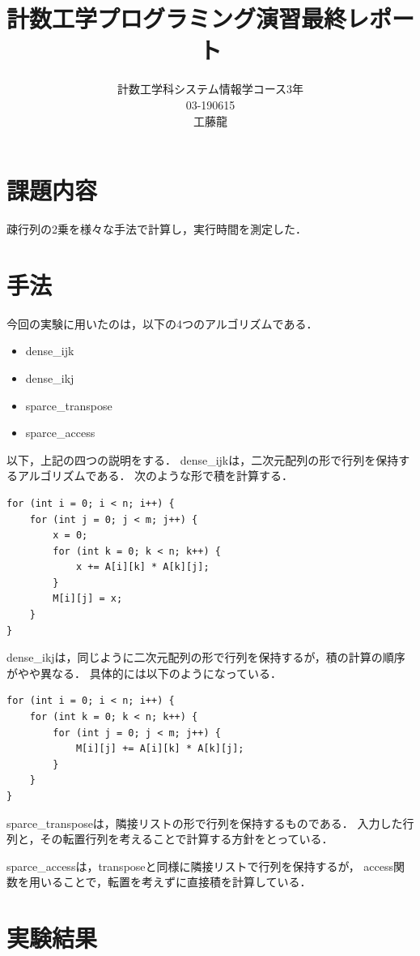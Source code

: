 \documentclass[11pt,a4paper]{jsarticle}
\begin{document}
\title{計数工学プログラミング演習最終レポート}
\author{計数工学科システム情報学コース3年\\03-190615\\工藤龍}
\maketitle

\section{課題内容}

疎行列の2乗を様々な手法で計算し，実行時間を測定した．

\section{手法}

今回の実験に用いたのは，以下の4つのアルゴリズムである．
\begin{itemize}
\item dense_ijk
\item dense_ikj
\item sparce_transpose
\item sparce_access
\end{itemize}
以下，上記の四つの説明をする．
dense_ijkは，二次元配列の形で行列を保持するアルゴリズムである．
次のような形で積を計算する．
\begin{lstlisting}
for (int i = 0; i < n; i++) {
    for (int j = 0; j < m; j++) {
        x = 0;
        for (int k = 0; k < n; k++) {
            x += A[i][k] * A[k][j];
        }
        M[i][j] = x;
    }
}
\end{lstlisting}

dense_ikjは，同じように二次元配列の形で行列を保持するが，積の計算の順序がやや異なる．
具体的には以下のようになっている．
\begin{lstlisting}
for (int i = 0; i < n; i++) {
    for (int k = 0; k < n; k++) {
        for (int j = 0; j < m; j++) {
            M[i][j] += A[i][k] * A[k][j];
        }
    }
}
\end{lstlisting}

sparce_transposeは，隣接リストの形で行列を保持するものである．
入力した行列と，その転置行列を考えることで計算する方針をとっている．

sparce_accessは，transposeと同様に隣接リストで行列を保持するが，
access関数を用いることで，転置を考えずに直接積を計算している．

\section{実験結果}
\end{document}
